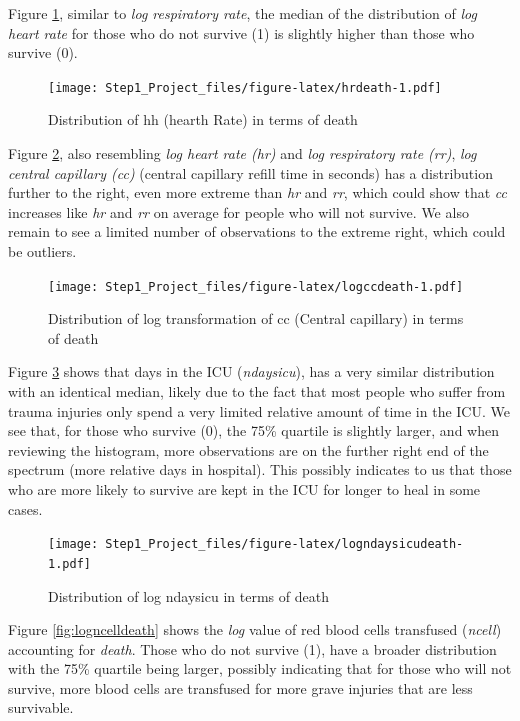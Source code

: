 \documentclass[
]{article}
\begin{document}
Figure \ref{fig:hrdeath}, similar to \emph{log respiratory rate}, the
median of the distribution of \emph{log heart rate} for those who do not
survive (1) is slightly higher than those who survive (0).

\begin{figure}
\centering
\texttt{[image: Step1\_Project\_files/figure-latex/hrdeath-1.pdf]}
\caption{Distribution of hh (hearth Rate) in terms of
death\label{fig:hrdeath}}
\end{figure}

\newpage

Figure \ref{fig:logccdeath}, also resembling \emph{log heart rate (hr)}
and \emph{log respiratory rate (rr)}, \emph{log central capillary (cc)}
(central capillary refill time in seconds) has a distribution further to
the right, even more extreme than \emph{hr} and \emph{rr}, which could
show that \emph{cc} increases like \emph{hr} and \emph{rr} on average
for people who will not survive. We also remain to see a limited number
of observations to the extreme right, which could be outliers.

\begin{figure}
\centering
\texttt{[image: Step1\_Project\_files/figure-latex/logccdeath-1.pdf]}
\caption{Distribution of log transformation of cc (Central capillary) in
terms of death\label{fig:logccdeath}}
\end{figure}

Figure \ref{fig:logndaysicudeath} shows that days in the ICU
(\emph{ndaysicu}), has a very similar distribution with an identical
median, likely due to the fact that most people who suffer from trauma
injuries only spend a very limited relative amount of time in the ICU.
We see that, for those who survive (0), the 75\% quartile is slightly
larger, and when reviewing the histogram, more observations are on the
further right end of the spectrum (more relative days in hospital). This
possibly indicates to us that those who are more likely to survive are
kept in the ICU for longer to heal in some cases.

\begin{figure}
\centering
\texttt{[image: Step1\_Project\_files/figure-latex/logndaysicudeath-1.pdf]}
\caption{Distribution of log ndaysicu in terms of
death\label{fig:logndaysicudeath}}
\end{figure}

\newpage

Figure \ref{fig:logncelldeath} shows the \emph{log} value of red blood
cells transfused (\emph{ncell}) accounting for \emph{death}. Those who
do not survive (1), have a broader distribution with the 75\% quartile
being larger, possibly indicating that for those who will not survive,
more blood cells are transfused for more grave injuries that are less
survivable.
\end{document}
